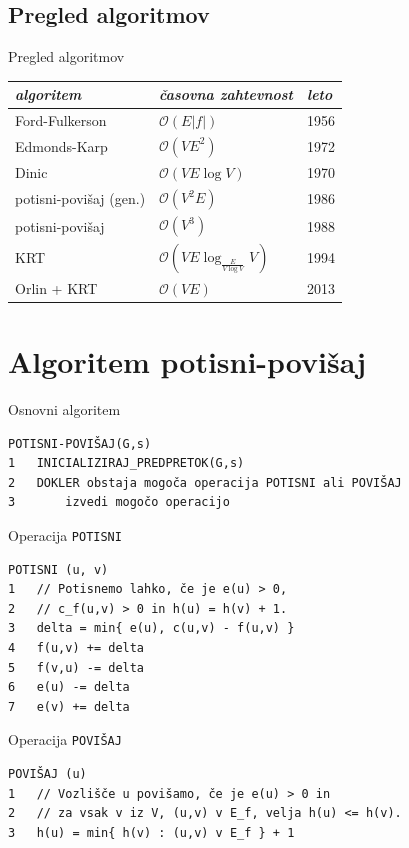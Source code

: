 \documentclass{beamer}
\begin{document}
\subsection{Pregled algoritmov}
\begin{frame}{Pregled algoritmov}
    \centering
    \begin{tabular}{|l||l|l|}\hline
        \textit{algoritem} & \textit{časovna zahtevnost} & \textit{leto}\\\hline\hline
        Ford-Fulkerson & $\mathcal{O}(E |f|)$ & 1956 \\\hline
        Edmonds-Karp & $\mathcal{O}(VE^2)$ & 1972 \\\hline
        Dinic & $\mathcal{O}(VE \log V)$ & 1970 \\\hline
        potisni-povišaj (gen.) & $\mathcal{O}(V^2E)$ & 1986 \\\hline
        potisni-povišaj & $\mathcal{O}(V^3)$ & 1988 \\\hline
        KRT & $\mathcal{O}(VE \log_{\frac{E}{V \log V}} V)$ & 1994 \\\hline
        Orlin + KRT & $\mathcal{O}(VE)$ & 2013 \\\hline
    \end{tabular}
\end{frame}

\section{Algoritem potisni-povišaj}
\begin{frame}[fragile]{Osnovni algoritem}
\begin{verbatim}
POTISNI-POVIŠAJ(G,s)
1   INICIALIZIRAJ_PREDPRETOK(G,s)
2   DOKLER obstaja mogoča operacija POTISNI ali POVIŠAJ
3       izvedi mogočo operacijo
\end{verbatim}
\end{frame}

\begin{frame}[fragile]{Operacija \texttt{POTISNI}}
\begin{verbatim}
POTISNI (u, v)
1   // Potisnemo lahko, če je e(u) > 0,
2   // c_f(u,v) > 0 in h(u) = h(v) + 1.
3   delta = min{ e(u), c(u,v) - f(u,v) }
4   f(u,v) += delta
5   f(v,u) -= delta
6   e(u) -= delta
7   e(v) += delta
\end{verbatim}
\end{frame}

\begin{frame}[fragile]{Operacija \texttt{POVIŠAJ}}
\begin{verbatim}
POVIŠAJ (u)
1   // Vozlišče u povišamo, če je e(u) > 0 in
2   // za vsak v iz V, (u,v) v E_f, velja h(u) <= h(v).
3   h(u) = min{ h(v) : (u,v) v E_f } + 1
\end{verbatim}
\end{frame}
\end{document}
